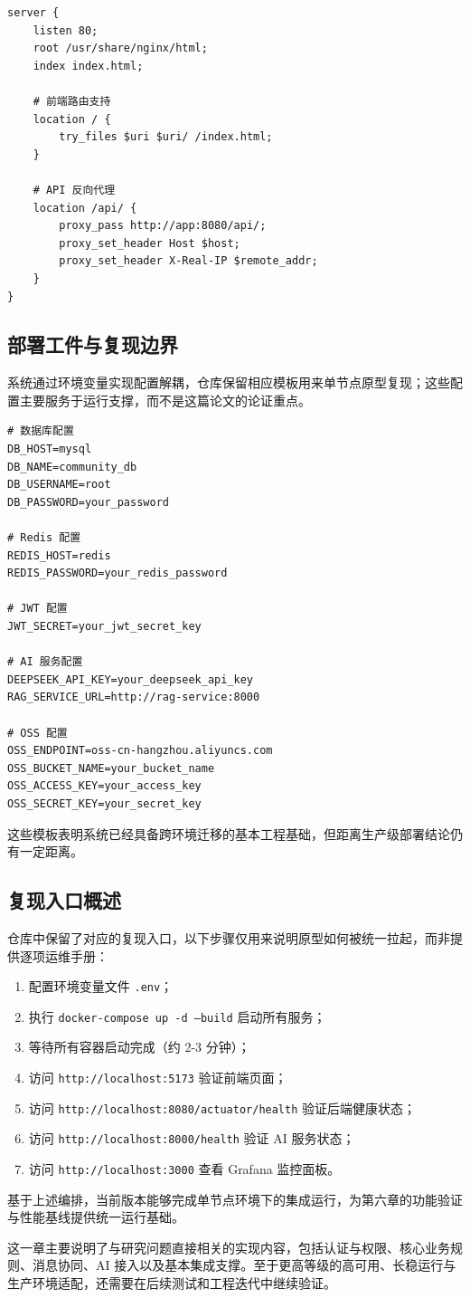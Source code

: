\begin{lstlisting}[caption=Nginx 配置（节选）]
server {
    listen 80;
    root /usr/share/nginx/html;
    index index.html;

    # 前端路由支持
    location / {
        try_files $uri $uri/ /index.html;
    }

    # API 反向代理
    location /api/ {
        proxy_pass http://app:8080/api/;
        proxy_set_header Host $host;
        proxy_set_header X-Real-IP $remote_addr;
    }
}
\end{lstlisting}

\subsection{部署工件与复现边界}

系统通过环境变量实现配置解耦，仓库保留相应模板用来单节点原型复现；这些配置主要服务于运行支撑，而不是这篇论文的论证重点。

\begin{lstlisting}[caption=环境变量配置示例]
# 数据库配置
DB_HOST=mysql
DB_NAME=community_db
DB_USERNAME=root
DB_PASSWORD=your_password

# Redis 配置
REDIS_HOST=redis
REDIS_PASSWORD=your_redis_password

# JWT 配置
JWT_SECRET=your_jwt_secret_key

# AI 服务配置
DEEPSEEK_API_KEY=your_deepseek_api_key
RAG_SERVICE_URL=http://rag-service:8000

# OSS 配置
OSS_ENDPOINT=oss-cn-hangzhou.aliyuncs.com
OSS_BUCKET_NAME=your_bucket_name
OSS_ACCESS_KEY=your_access_key
OSS_SECRET_KEY=your_secret_key
\end{lstlisting}

这些模板表明系统已经具备跨环境迁移的基本工程基础，但距离生产级部署结论仍有一定距离。

\subsection{复现入口概述}

仓库中保留了对应的复现入口，以下步骤仅用来说明原型如何被统一拉起，而非提供逐项运维手册：

\begin{enumerate}
  \item 配置环境变量文件 \texttt{.env}；
  \item 执行 \texttt{docker-compose up -d --build} 启动所有服务；
  \item 等待所有容器启动完成（约 2-3 分钟）；
  \item 访问 \texttt{http://localhost:5173} 验证前端页面；
  \item 访问 \texttt{http://localhost:8080/actuator/health} 验证后端健康状态；
  \item 访问 \texttt{http://localhost:8000/health} 验证 AI 服务状态；
  \item 访问 \texttt{http://localhost:3000} 查看 Grafana 监控面板。
\end{enumerate}

基于上述编排，当前版本能够完成单节点环境下的集成运行，为第六章的功能验证与性能基线提供统一运行基础。

这一章主要说明了与研究问题直接相关的实现内容，包括认证与权限、核心业务规则、消息协同、AI 接入以及基本集成支撑。至于更高等级的高可用、长稳运行与生产环境适配，还需要在后续测试和工程迭代中继续验证。



